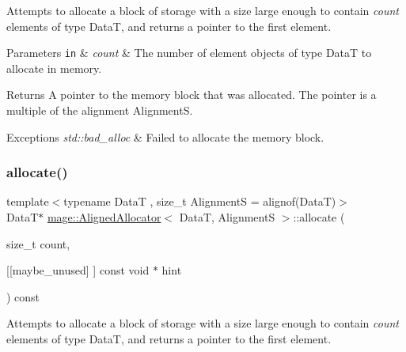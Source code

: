 Attempts to allocate a block of storage with a size large enough to contain {\itshape count} elements of type {\ttfamily DataT}, and returns a pointer to the first element.


\begin{DoxyParams}[1]{Parameters}
\mbox{\tt in}  & {\em count} & The number of element objects of type {\ttfamily DataT} to allocate in memory. \\
\hline
\end{DoxyParams}
\begin{DoxyReturn}{Returns}
A pointer to the memory block that was allocated. The pointer is a multiple of the alignment {\ttfamily AlignmentS}. 
\end{DoxyReturn}

\begin{DoxyExceptions}{Exceptions}
{\em std\+::bad\+\_\+alloc} & Failed to allocate the memory block. \\
\hline
\end{DoxyExceptions}
\hypertarget{classmage_1_1_aligned_allocator_aff8039dfa7eae184e527bf13b2fac431}{}\label{classmage_1_1_aligned_allocator_aff8039dfa7eae184e527bf13b2fac431} 
\subsubsection{\texorpdfstring{allocate()}{allocate()}\hspace{0.1cm}{\footnotesize\ttfamily [2/2]}}
{\footnotesize\ttfamily template$<$typename DataT , size\+\_\+t AlignmentS = alignof(\+Data\+T)$>$ \\
DataT$\ast$ \hyperlink{classmage_1_1_aligned_allocator}{mage\+::\+Aligned\+Allocator}$<$ DataT, AlignmentS $>$\+::allocate (\begin{DoxyParamCaption}\item[{size\+\_\+t}]{count,  }\item[{\mbox{[}\mbox{[}maybe\+\_\+unused\mbox{]} \mbox{]} const void $\ast$}]{hint }\end{DoxyParamCaption}) const}

Attempts to allocate a block of storage with a size large enough to contain {\itshape count} elements of type {\ttfamily DataT}, and returns a pointer to the first element.


